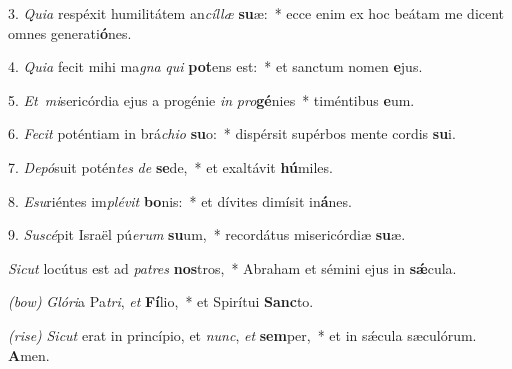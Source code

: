 3. \textit{Quia} respéxit humilitátem an\textit{cíl}\textit{læ} \textbf{su}æ:~*
	ecce enim ex hoc beátam me dicent omnes generati\textbf{ó}nes.

4. \textit{Quia} fecit mihi ma\textit{gna} \textit{qui} \textbf{pot}ens est:~*
	et sanctum nomen \textbf{e}jus.

5. \textit{Et\ mi}sericórdia ejus a progénie \textit{in} \textit{pro}\textbf{gé}nies~*
	timéntibus \textbf{e}um.

6. \textit{Fecit} poténtiam in brá\textit{chi}\textit{o} \textbf{su}o:~*
	dispérsit supérbos mente cordis \textbf{su}i.

7. \textit{Depó}suit potén\textit{tes} \textit{de} \textbf{se}de,~*
	et exaltávit \textbf{hú}miles.

8. \textit{Esu}riéntes im\textit{plé}\textit{vit} \textbf{bo}nis:~*
	et dívites dimísit in\textbf{á}nes.

9. \textit{Suscé}pit Israël pú\textit{e}\textit{rum} \textbf{su}um,~*
	recordátus misericórdiæ \textbf{su}æ.

\textit{Sicut} locútus est ad \textit{pa}\textit{tres} \textbf{nos}tros,~*
	Abraham et sémini ejus in \textbf{s\'{\ae}}cula.

{\color{red}\textit{(bow)}} \textit{Glóri}a Pa\textit{tri}, \textit{et} \textbf{Fí}lio,~*
	et Spirítui \textbf{Sanc}to.

{\color{red}\textit{(rise)}} \textit{Sicut} erat in princípio, et \textit{nunc}, \textit{et} \textbf{sem}per,~*
	et in s\'{\ae}cula sæculórum. \textbf{A}men.